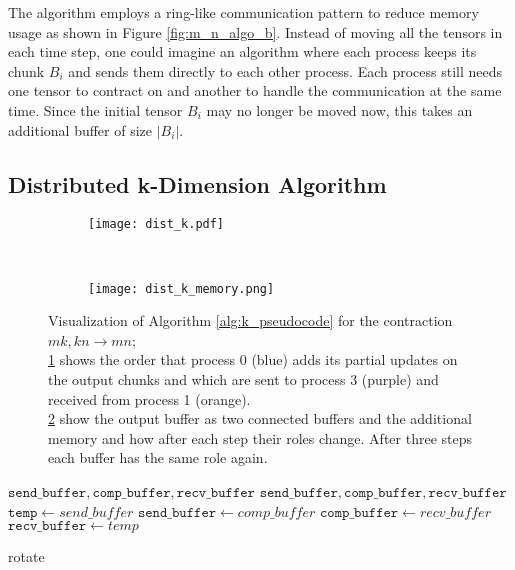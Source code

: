 The algorithm employs a ring-like communication pattern to reduce memory usage as shown in Figure \ref{fig:m_n_algo_b}.
Instead of moving all the tensors in each time step, one could imagine an algorithm where each process keeps its chunk $B_i$ and sends them directly to each other process.
Each process still needs one tensor to contract on and another to handle the communication at the same time.
Since the initial tensor $B_i$ may no longer be moved now, this takes an additional buffer of size $|B_i|$.

\subsection{Distributed k-Dimension Algorithm}

\begin{figure}[ht]
    \centering
    \begin{subfigure}[t]{0.6\textwidth}
        \centering
        \texttt{[image: dist\_k.pdf]}
        \label{fig:k_algo_a}
    \end{subfigure}
    ~
    \begin{subfigure}[t]{0.35\textwidth}
        \centering\texttt{[image: dist\_k\_memory.png]}
        \label{fig:k_algo_b}
    \end{subfigure}
    \caption{Visualization of Algorithm \ref{alg:k_pseudocode} for the contraction $mk,kn \rightarrow mn$;\\
    \ref{fig:k_algo_a} shows the order that process 0 (blue) adds its partial updates on the output chunks and which are sent to process 3 (purple) and received from process 1 (orange).\\
    \ref{fig:k_algo_b} show the output buffer as two connected buffers and the additional memory and how after each step their roles change.
    After three steps each buffer has the same role again.
    }
    \label{fig:k_algo}
\end{figure}


\begin{algorithm}[ht]
    \begin{algorithmic}
        \Require $\texttt{send\_buffer},\texttt{comp\_buffer},\texttt{recv\_buffer}$
        \Ensure $\texttt{send\_buffer},\texttt{comp\_buffer},\texttt{recv\_buffer}$
        \State $\texttt{temp} \gets {send\_buffer}$
        \State $\texttt{send\_buffer} \gets {comp\_buffer}$
        \State $\texttt{comp\_buffer} \gets {recv\_buffer}$
        \State $\texttt{recv\_buffer} \gets {temp}$
    \end{algorithmic}
    \caption{rotate}
    \label{rotate_pseudocode}
\end{algorithm}

